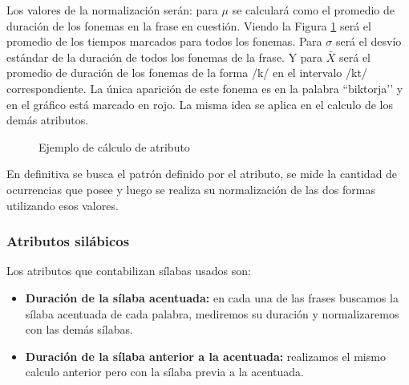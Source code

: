 Los valores de la normalización serán: para $\mu$ se calculará como el promedio de duración de los fonemas en la frase en cuestión. Viendo la Figura \ref{ejemploAtribFon} será el promedio de los tiempos marcados para todos los fonemas. Para $\sigma$ será el desvío estándar de la duración de todos los fonemas de la frase. Y para $\bar{X}$ será el promedio de duración de los fonemas de la forma /k/ en el intervalo /kt/ correspondiente. La única aparición de este fonema es en la palabra ``biktorja’’ y en el gráfico está marcado en rojo. La misma idea se aplica en el calculo de los demás atributos.

\begin{figure}[H]
\centering
{}
\caption{Ejemplo de cálculo de atributo}
\label{ejemploAtribFon}
\end{figure}

En definitiva se busca el patrón definido por el atributo, se mide la cantidad de ocurrencias que posee y luego se realiza su normalización de las dos formas utilizando esos valores. 

\subsubsection{Atributos silábicos}

Los atributos que contabilizan sílabas usados son:

\begin{itemize}
    \item \textbf{Duración de la sílaba acentuada:} en cada una de las frases buscamos la sílaba acentuada de cada palabra, mediremos su duración y normalizaremos con las demás sílabas.
    \item \textbf{Duración de la sílaba anterior a la acentuada:} realizamos el mismo calculo anterior pero con la sílaba previa a la acentuada. 
\end{itemize}

